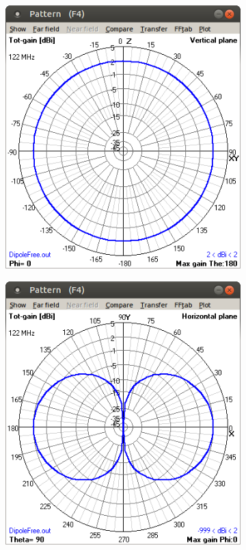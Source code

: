 	\begin{figure}[H]
	\centering
	  \begin{subfigure}[b]{0.32\textwidth}
	  \includegraphics[width=\textwidth]{./images/1.Dypole_Free/1_vertical.png}
	  \caption{}
	  \label{1diag1}
	  \end{subfigure}
	  \qquad %
	  \begin{subfigure}[b]{0.32\textwidth}
	  \includegraphics[width=\textwidth]{./images/1.Dypole_Free/1_horizontal.png}

\end{subfigure}
\end{figure}
